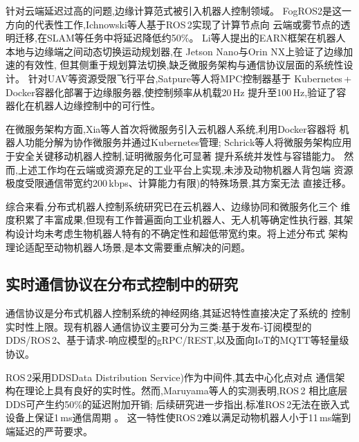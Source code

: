 针对云端延迟过高的问题,边缘计算范式被引入机器人控制领域。
FogROS2是这一方向的代表性工作,Ichnowski等人基于ROS\,2实现了计算节点向
云端或雾节点的透明迁移,在SLAM等任务中将延迟降低约50\%\cite{ichnowski2023fogros2}。
Li等人提出的EARN框架在机器人本地与边缘端之间动态切换运动规划器,在
Jetson Nano与Orin NX上验证了边缘加速的有效性\cite{li2025earn},
但其侧重于规划算法切换,缺乏微服务架构与通信协议层面的系统性设计。
针对UAV等资源受限飞行平台,Satpure等人将MPC控制器基于
Kubernetes\,+\,Docker容器化部署于边缘服务器,使控制频率从机载20\,Hz
提升至100\,Hz\cite{satpure2022mpc},验证了容器化在机器人边缘控制中的可行性。
 
在微服务架构方面,Xia等人首次将微服务引入云机器人系统,利用Docker容器将
机器人功能分解为协作微服务并通过Kubernetes管理\cite{xia2018microservice};
Schrick等人将微服务架构应用于安全关键移动机器人控制,证明微服务化可显著
提升系统并发性与容错能力\cite{schrick2024safety}。
然而,上述工作均在云端或资源充足的工业平台上实现,未涉及动物机器人背包端
资源极度受限通信带宽约200\,kbps、计算能力有限)的特殊场景,其方案无法
直接迁移。
 
综合来看,分布式机器人控制系统研究已在云机器人、边缘协同和微服务化三个
维度积累了丰富成果,但现有工作普遍面向工业机器人、无人机等确定性执行器,
其架构设计均未考虑生物机器人特有的不确定性和超低带宽约束。将上述分布式
架构理论适配至动物机器人场景,是本文需要重点解决的问题。

\subsection{实时通信协议在分布式控制中的研究}
通信协议是分布式机器人控制系统的神经网络,其延迟特性直接决定了系统的
控制实时性上限。现有机器人通信协议主要可分为三类:基于发布-订阅模型的
DDS/ROS\,2、基于请求-响应模型的gRPC/REST,以及面向IoT的MQTT等轻量级
协议\cite{profanter2019opcua}。
 
ROS\,2采用DDSData Distribution Service)作为中间件,其去中心化点对点
通信架构在理论上具有良好的实时性。然而,Maruyama等人的实测表明,ROS\,2
相比底层DDS可产生约50\%的延迟附加开销\cite{maruyama2016exploring};
后续研究进一步指出,标准ROS\,2无法在嵌入式设备上保证1\,ms通信周期
\cite{PlaceholderROS2Realtime2023}。
这一特性使ROS\,2难以满足动物机器人小于11\,ms端到端延迟的严苛要求。
 
 
